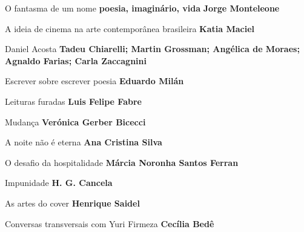 \begin{multicols}{2}
\begin{enumerate}
{\item O fantasma de um nome \textbf{poesia, imaginário, vida} \textbf{Jorge Monteleone}
\item A ideia de cinema na arte contemporânea brasileira \textbf{Katia Maciel}
\item Daniel Acosta \textbf{Tadeu Chiarelli; Martin Grossman; Angélica de Moraes; Agnaldo Farias; Carla Zaccagnini}
\item Escrever sobre escrever poesia \textbf{Eduardo Milán}
\item Leituras furadas \textbf{Luis Felipe Fabre}
\item Mudança \textbf{Verónica Gerber Bicecci}
\item A noite não é eterna \textbf{Ana Cristina Silva}
\item O desafio da hospitalidade \textbf{Márcia Noronha Santos Ferran}
\item Impunidade \textbf{H. G. Cancela}
\item As artes do cover \textbf{Henrique Saidel}
\item Conversas transversais com Yuri Firmeza \textbf{Cecília Bedê}
}
\end{enumerate}
\end{multicols}

\pagebreak
